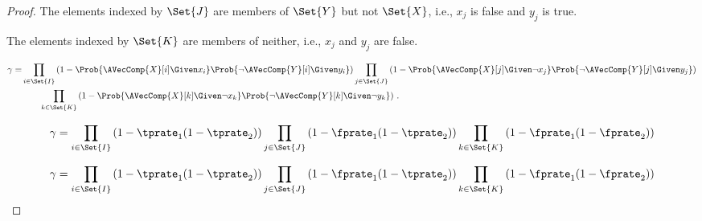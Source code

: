 \begin{proof}
The elements indexed by $\Set{J}$ are members of $\Set{Y}$ but not $\Set{X}$,
i.e., $x_j$ is false and $y_j$ is true.

The elements indexed by $\Set{K}$ are members of neither, i.e., $x_j$ and $y_j$
are false.


\begin{equation}
\begin{split}
\gamma =
    &\prod_{i \in \Set{I}}
        \left(1-\Prob{\AVecComp{X}[i] \Given x_i}
        \Prob{\neg \AVecComp{Y}[i] \Given y_i}\right)
    \prod_{j \in \Set{J}}
        \left(1-\Prob{\AVecComp{X}[j] \Given \neg x_j}
        \Prob{\neg \AVecComp{Y}[j] \Given y_j}\right)\\
    &\qquad \prod_{k \in \Set{K}}
        \left(1-\Prob{\AVecComp{X}[k] \Given \neg x_k}
        \Prob{\neg \AVecComp{Y}[k] \Given \neg y_k}\right)\,.  
\end{split}    
\end{equation}



\begin{equation}
\gamma =
    \prod_{i \in \Set{I}}
        \left(1 - \tprate_1
        (1 - \tprate_2)\right)
    \prod_{j \in \Set{J}}
        \left(1 - \fprate_1
        (1 - \tprate_2)\right)
    \prod_{k \in \Set{K}}
        \left(1 - \fprate_1
        (1 - \fprate_2)\right)
\end{equation}



\begin{equation}
\gamma =
\prod_{i \in \Set{I}}
\left(1 - \tprate_1
(1 - \tprate_2)\right)
\prod_{j \in \Set{J}}
\left(1 - \fprate_1
(1 - \tprate_2)\right)
\prod_{k \in \Set{K}}
\left(1 - \fprate_1
(1 - \fprate_2)\right)
\end{equation}




\end{proof}
